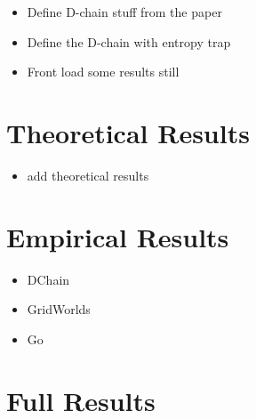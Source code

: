     \begin{itemize}
        \item Define D-chain stuff from the paper
        \item Define the D-chain with entropy trap
        \item Front load some results still
    \end{itemize}

\section{Theoretical Results}
\label{sec:4-4-theory}

    \begin{itemize}
        \item add theoretical results
    \end{itemize}

\section{Empirical Results}
\label{sec:4-5-results}

    \begin{itemize}
        \item DChain
        \item GridWorlds
        \item Go
    \end{itemize}

\section{Full Results}
\label{sec:4-6-fullresults}

